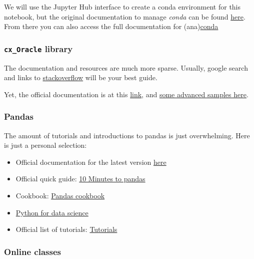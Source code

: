 \documentclass[11pt]{article}
\providecommand{\tightlist}{%
      \setlength{\itemsep}{0pt}\setlength{\parskip}{0pt}}
\begin{document}
We will use the Jupyter Hub interface to create a conda environment for
this notebook, but the original documentation to manage \emph{conda} can
be found
\href{https://conda.io/docs/user-guide/tasks/manage-environments.html}{here}.
From there you can also access the full documentation for
(ana)\href{https://conda.io/docs/index.html}{conda}

\subsubsection{\texorpdfstring{\texttt{cx\_Oracle}
library}{cx\_Oracle library}}\label{cx_oracle-library}

The documentation and resources are much more sparse. Usually, google
search and links to
\href{https://stackoverflow.com/search?q=cx_Oracle}{stackoverflow} will
be your best guide.

Yet, the official documentation is at this
\href{http://cx-oracle.readthedocs.io/en/latest/}{link}, and
\href{https://github.com/oracle/python-cx_Oracle/tree/master/samples}{some
advanced samples here}.

\subsubsection{Pandas}\label{pandas}

The amount of tutorials and introductions to pandas is just
overwhelming. Here is just a personal selection:

\begin{itemize}
\tightlist
\item
  Official documentation for the latest version
  \href{http://pandas.pydata.org/pandas-docs/stable/}{here}
\item
  Official quick guide:
  \href{http://pandas.pydata.org/pandas-docs/stable/10min.html}{10
  Minutes to pandas}
\item
  Cookbook: \href{https://github.com/jvns/pandas-cookbook}{Pandas
  cookbook}
\item
  \href{http://wavedatalab.github.io/datawithpython/index.html}{Python
  for data science}
\item
  Official list of tutorials:
  \href{http://pandas.pydata.org/pandas-docs/stable/tutorials.html}{Tutorials}
\end{itemize}

\subsubsection{Online classes}\label{online-classes}
\end{document}
